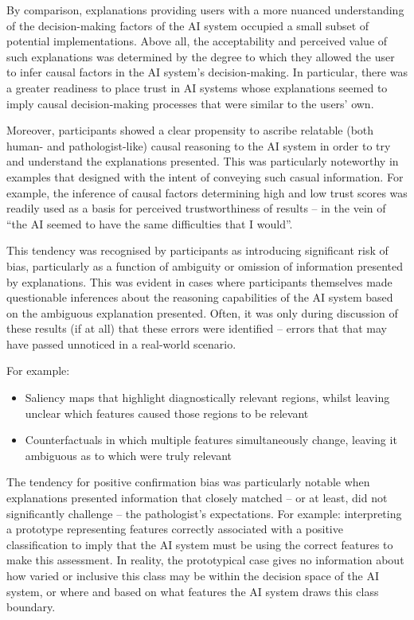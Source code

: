 \documentclass[final,5p,times,twocolumn,hyphens]{elsarticle}
\begin{document}
By comparison, explanations providing users with a more nuanced understanding of the decision-making factors of the AI system occupied a small subset of potential implementations. Above all, the acceptability and perceived value of such explanations was determined by the degree to which they allowed the user to infer causal factors in the AI system's decision-making. In particular, there was a greater readiness to place trust in AI systems whose explanations seemed to imply causal decision-making processes that were similar to the users' own.

Moreover, participants showed a clear propensity to ascribe relatable (both human- and pathologist-like) causal reasoning to the AI system in order to try and understand the explanations presented. This was particularly noteworthy in examples that designed with the intent of conveying such casual information. For example, the inference of causal factors determining high and low trust scores was readily used as a basis for perceived trustworthiness of results -- in the vein of ``the AI seemed to have the same difficulties that I would''.

This tendency was recognised by participants as introducing significant risk of bias, particularly as a function of ambiguity or omission of information presented by explanations. This was evident in cases where participants themselves made questionable inferences about the reasoning capabilities of the AI system based on the ambiguous explanation presented. Often, it was only during discussion of these results (if at all) that these errors were identified -- errors that that may have passed unnoticed in a real-world scenario. 

For example:
\begin{itemize}
    \item Saliency maps that highlight diagnostically relevant regions, whilst leaving unclear which features caused those regions to be relevant
    \item Counterfactuals in which multiple features simultaneously change, leaving it ambiguous as to which were truly relevant
\end{itemize}

The tendency for positive confirmation bias was particularly notable when explanations presented information that closely matched -- or at least, did not significantly challenge -- the pathologist's expectations. For example: interpreting a prototype representing features correctly associated with a positive classification to imply that the AI system must be using the correct features to make this assessment. In reality, the prototypical case gives no information about how varied or inclusive this class may be within the decision space of the AI system, or where and based on what features the AI system draws this class boundary.
\end{document}
